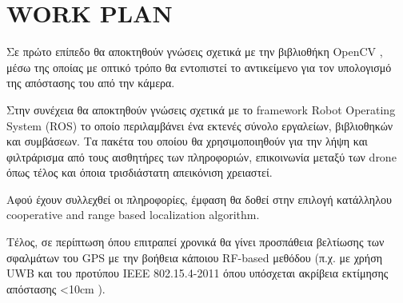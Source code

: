\section{WORK PLAN}
Σε πρώτο επίπεδο θα αποκτηθούν γνώσεις σχετικά με την βιβλιοθήκη OpenCV \cite{opencv}, μέσω της οποίας
με οπτικό τρόπο θα εντοπιστεί το αντικείμενο για τον υπολογισμό της απόστασης του από την
κάμερα.

Στην συνέχεια θα αποκτηθούν γνώσεις σχετικά με το framework Robot Operating System (ROS) \cite{ros} το οποίο 
πε\-ρι\-λα\-μβά\-νει ένα εκτενές σύνολο εργαλείων, βιβλιοθηκών και συ\-μβά\-σεων. Τα πακέτα του οποίου θα χρησιμοποιηθούν για την
λήψη και φιλτράρισμα από τους αισθητήρες των πληροφοριών, επικοινωνία μεταξύ των drone όπως τέλος και 
όποια τρι\-σδιά\-στα\-τη απεικόνιση χρειαστεί. 

Αφού έχουν συλλεχθεί οι πληροφορίες, έμφαση θα δοθεί στην επιλογή κατάλληλου cooperative and range based localization algorithm.

Τέλος, σε πε\-ρί\-πτωση όπου επι\-τρα\-πεί χρο\-νικά θα γίνει προ\-σπά\-θεια βελτίωσης των σφαλμάτων του 
GPS με την βοήθεια κάποιου RF-based μεθόδου (π.χ. με χρήση UWB και του προτύπου IEEE 802.15.4-2011 όπου
υπόσχεται ακρίβεια εκτίμησης απόστασης <10cm \cite{uwb-accuracy}).




